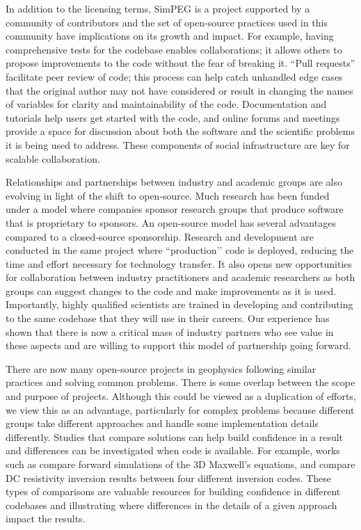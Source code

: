 In addition to the licensing terms, SimPEG is a project supported by a community of contributors and the set of open-source practices used in this community have implications on its growth and impact. For example, having comprehensive tests for the codebase enables collaborations; it allows others to propose improvements to the code without the fear of breaking it. ``Pull requests'' facilitate peer review of code; this process can help catch unhandled edge cases that the original author may not have considered or result in changing the names of variables for clarity and maintainability of the code. Documentation and tutorials help users get started with the code, and online forums and meetings provide a space for discussion about both the software and the scientific problems it is being used to address. These components of social infrastructure are key for scalable collaboration.

Relationships and partnerships between industry and academic groups are also evolving in light of the shift to open-source. Much research has been funded under a model where companies sponsor research groups that produce software that is proprietary to sponsors. An open-source model has several advantages compared to a closed-source sponsorship. Research and development are conducted in the same project where ``production’' code is deployed, reducing the time and effort necessary for technology transfer. It also opens new opportunities for collaboration between industry practitioners and academic researchers as both groups can suggest changes to the code and make improvements as it is used. Importantly, highly qualified scientists are trained in developing and contributing to the same codebase that they will use in their careers. Our experience has shown that there is now a critical mass of industry partners who see value in these aspects and are willing to support this model of partnership going forward.

There are now many open-source projects in geophysics following similar practices and solving common problems. There is some overlap between the scope and purpose of projects. Although this could be viewed as a duplication of efforts, we view this as an advantage, particularly for complex problems because different groups take different approaches and handle some implementation details differently. Studies that compare solutions can help build confidence in a result and differences can be investigated when code is available. For example, works such as \cite{Werthmuller2020} compare forward simulations of the 3D Maxwell's equations, and \cite{doyoro_review_2022} compare DC resistivity inversion results between four different inversion codes. These types of comparisons are valuable resources for building confidence in different codebases and illustrating where differences in the details of a given approach impact the results.

